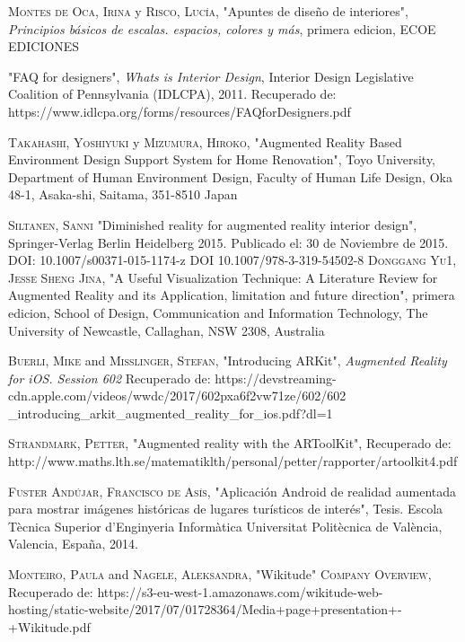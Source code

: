 \begin{thebibliography}{X}
	
	 \textsc{Montes de Oca, Irina} y \textsc{Risco, Lucía},
	"Apuntes de diseño de interiores",
	\textit{Principios básicos de escalas. espacios, colores y más}, primera edicion,
	ECOE EDICIONES
	
	 "FAQ for designers", \textit{Whats is Interior Design}, Interior Design Legislative Coalition of Pennsylvania (IDLCPA), 2011. Recuperado de: https://www.idlcpa.org/forms/resources/FAQforDesigners.pdf
	
	 \textsc{Takahashi, Yoshiyuki} y \textsc{Mizumura, Hiroko},
	"Augmented Reality Based Environment Design Support System for Home Renovation", Toyo  University, Department of Human Environment Design, Faculty of Human Life Design, Oka 48-1, Asaka-shi, Saitama, 351-8510 Japan 
	
	 \textsc{Siltanen, Sanni} "Diminished reality for augmented reality interior design", Springer-Verlag Berlin Heidelberg 2015. Publicado el: 30 de Noviembre de 2015. DOI: 10.1007/s00371-015-1174-z
	DOI 10.1007/978-3-319-54502-8
	 \textsc{Donggang Yu1, Jesse Sheng Jina},
	"A Useful Visualization Technique: A Literature Review for Augmented Reality and its Application, limitation and future direction", primera edicion,
	School of Design, Communication and Information Technology, The University of Newcastle, Callaghan, NSW 2308, Australia
	
	 \textsc{Buerli, Mike} and \textsc{Misslinger, Stefan}, "Introducing ARKit", \textit{Augmented Reality for iOS. Session 602} Recuperado de: https://devstreaming-cdn.apple.com/videos/wwdc/2017/602pxa6f2vw71ze/602/602
	\_introducing\_arkit\_augmented\_reality\_for\_ios.pdf?dl=1
	
	 \textsc{Strandmark, Petter}, "Augmented reality with the ARToolKit", Recuperado de: http://www.maths.lth.se/matematiklth/personal/petter/rapporter/artoolkit4.pdf
	
	 \textsc{Fuster Andújar, Francisco de Asís}, "Aplicación Android de realidad aumentada para mostrar imágenes históricas de lugares turísticos de interés", Tesis. Escola Tècnica Superior d’Enginyeria Informàtica Universitat Politècnica de València, Valencia, España, 2014.
	
	 \textsc{Monteiro, Paula} and \textsc{Nagele, Aleksandra}, "Wikitude" \textsc{Company Overview}, Recuperado de: https://s3-eu-west-1.amazonaws.com/wikitude-web-hosting/static-website/2017/07/01728364/Media+page+presentation+-+Wikitude.pdf
	

\end{thebibliography}
